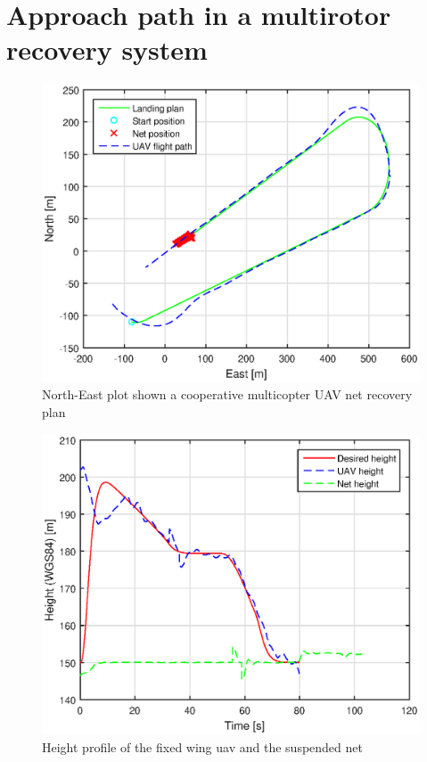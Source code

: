\chapter{Approach path in a multirotor recovery system}
\begin{figure}
\centering
\includegraphics[scale=0.7]{figs/Experiment/cooperativeNorthEast1juni114102.eps}
\caption{North-East plot shown a cooperative multicopter UAV net recovery plan}
\label{Fig:NorthEastMultirotor}
\end{figure}
\begin{figure}
\centering
\includegraphics[scale=0.7]{figs/Experiment/cooperativeHeight1juni114102.eps}
\caption{Height profile of the fixed wing \gls{uav} and the suspended net}
\end{figure}